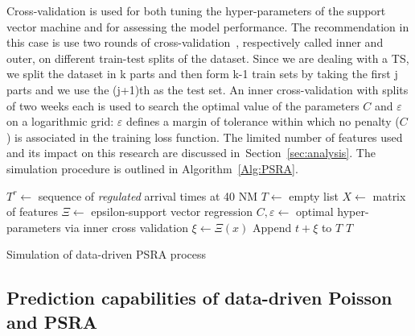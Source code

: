 \documentclass[draft,review]{elsarticle}
\begin{document}
Cross-validation is used for both tuning the hyper-parameters of the support vector machine and for assessing the model performance. The recommendation in this case is use two rounds of cross-validation~\citep{cawley2010over}, respectively called inner and outer, on different train-test splits of the dataset. Since we are dealing with a TS, we split the dataset in k parts and then form k-1 train sets by taking the first j parts and we use the (j+1)th as the test set.
An inner cross-validation with splits of two weeks each is used to search the optimal value of the parameters \(C\) and \(\varepsilon\) on a logarithmic grid:
\(\varepsilon\) defines a margin of tolerance within which no penalty (\(C\)) is associated in the training loss function.
The limited number of features used and its impact on this research are discussed in~Section~\ref{sec:analysis}.
The simulation procedure is outlined in Algorithm~\ref{Alg:PSRA}.

\begin{algorithm}
\begin{algorithmic}[1]
    \STATE \(T^{r} \leftarrow \) sequence of \emph{regulated} arrival times at 40 NM
    \STATE \(T \leftarrow \) empty list
    \STATE \(X \leftarrow \) matrix of features
    \STATE \(\Xi \leftarrow \) epsilon-support vector regression
    \STATE \(C, \varepsilon \leftarrow \) optimal hyper-parameters via inner cross validation
        \STATE \(\xi \leftarrow \Xi(x)\)
        \STATE Append \(t + \xi\) to \(T\)
    \ENDFOR
    \RETURN \(T\)
\end{algorithmic}
\caption{Simulation of data-driven PSRA process}\label{Alg:PSRA}
\end{algorithm}

\subsection{Prediction capabilities of data-driven Poisson and \acs{PSRA}}\label{sec:dm_comparison}
\end{document}
